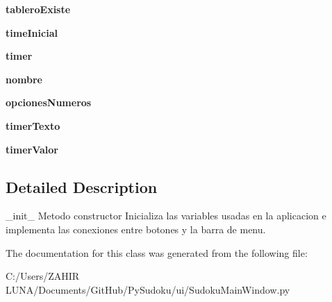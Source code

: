 \begin{DoxyCompactItemize}
\item 
\hypertarget{class_sudoku_main_window_1_1_sudoku_main_window_a549e0432a4386a67cb4ee4d3741c0835}{{\bfseries tablero\-Existe}}\label{class_sudoku_main_window_1_1_sudoku_main_window_a549e0432a4386a67cb4ee4d3741c0835}

\item 
\hypertarget{class_sudoku_main_window_1_1_sudoku_main_window_ade06c7abd46ed3d4385ebf0e01b670b1}{{\bfseries time\-Inicial}}\label{class_sudoku_main_window_1_1_sudoku_main_window_ade06c7abd46ed3d4385ebf0e01b670b1}

\item 
\hypertarget{class_sudoku_main_window_1_1_sudoku_main_window_ace319036ada7a045ab675ff38fa8ddb1}{{\bfseries timer}}\label{class_sudoku_main_window_1_1_sudoku_main_window_ace319036ada7a045ab675ff38fa8ddb1}

\item 
\hypertarget{class_sudoku_main_window_1_1_sudoku_main_window_ae9b4ab2489626295aa20808e8ffeeeca}{{\bfseries nombre}}\label{class_sudoku_main_window_1_1_sudoku_main_window_ae9b4ab2489626295aa20808e8ffeeeca}

\item 
\hypertarget{class_sudoku_main_window_1_1_sudoku_main_window_a370ea64e9453cab45cf57647f8ce6cf9}{{\bfseries opciones\-Numeros}}\label{class_sudoku_main_window_1_1_sudoku_main_window_a370ea64e9453cab45cf57647f8ce6cf9}

\item 
\hypertarget{class_sudoku_main_window_1_1_sudoku_main_window_a252168ae5d3f829d9403336f3c8893a3}{{\bfseries timer\-Texto}}\label{class_sudoku_main_window_1_1_sudoku_main_window_a252168ae5d3f829d9403336f3c8893a3}

\item 
\hypertarget{class_sudoku_main_window_1_1_sudoku_main_window_af4af3149f7ab37219efac57129609402}{{\bfseries timer\-Valor}}\label{class_sudoku_main_window_1_1_sudoku_main_window_af4af3149f7ab37219efac57129609402}

\end{DoxyCompactItemize}


\subsection{Detailed Description}
\begin{DoxyVerb}_init_
Metodo constructor
  Inicializa las variables usadas en la aplicacion e implementa las conexiones entre botones
  y la barra de menu.
\end{DoxyVerb}
 

The documentation for this class was generated from the following file\-:\begin{DoxyCompactItemize}
\item 
C\-:/\-Users/\-Z\-A\-H\-I\-R  L\-U\-N\-A/\-Documents/\-Git\-Hub/\-Py\-Sudoku/ui/Sudoku\-Main\-Window.\-py\end{DoxyCompactItemize}
